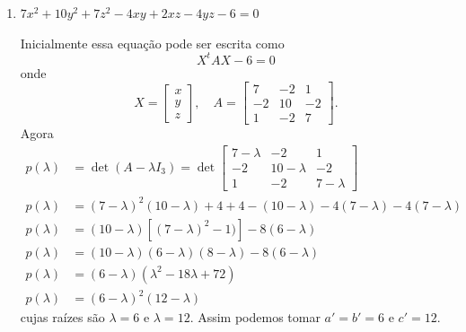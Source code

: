 \begin{exemplos}
\begin{enumerate}
\begin{solucao}
			Como $a' = b'$ devemos encontrar vetores $\vec{U_1}$ e $\vec{U_2}$ soluções unitárias e ortogonais do sistema linear $(A -I_3)X = 0$. Assim podemos tomar
			\begin{align*}
				\vec{U_1} &= \dfrac{1}{\norm{\vec{v_1}}}\vec{v_1} = (1,0,0)\\
				\vec{U_2} &= \dfrac{1}{\norm{\vec{v_2}}}\vec{v_2} = \left(0,-\dfrac{1}{\sqrt{2}},\dfrac{1}{\sqrt{2}}\right)\\
				\vec{U_3} &= \vec{U_1}\times\vec{U_2} = \left(0,-\dfrac{1}{\sqrt{2}},-\dfrac{1}{\sqrt{2}}\right)
			\end{align*}
			e com  isso a mudança $X = QX_1$, onde $Q = [\vec{U_1}\ \vec{U_2}\ \vec{U_3}]$ transforma a equação original em
			\[
				x_1^2 + y_1^2 - z_1^2 = 0
			\]
			que representa um cone circular.
		\end{solucao}

		\item $7x^2 + 10y^2 + 7z^2 - 4xy + 2xz - 4yz - 6 = 0$
		\begin{solucao}
			Inicialmente essa equação pode ser escrita como
			\[
				X^tAX - 6 = 0
			\]
			onde
			\[
				X = \begin{bmatrix}
					x\\ y\\ z
				\end{bmatrix},\quad A = \begin{bmatrix}
					7 & -2 & 1\\
					-2 & 10 & -2\\
					1 & -2 & 7
				\end{bmatrix}.
			\]
			Agora
			\begin{align*}
				p(\lambda) &= \det(A - \lambda I_3) = \det \begin{bmatrix}
					7 - \lambda & -2 & 1\\
					-2 & 10 -\lambda & -2\\
					1 & -2 & 7 -\lambda
				\end{bmatrix}\\
				p(\lambda) &= (7 - \lambda)^2(10 - \lambda) + 4 + 4 - (10 - \lambda) - 4(7 - \lambda) - 4(7 - \lambda)\\
				p(\lambda) &= (10 - \lambda)[(7 - \lambda)^2 - 1)] - 8(6 - \lambda)\\
				p(\lambda) &= (10 - \lambda)(6 - \lambda)(8 - \lambda) - 8(6 - \lambda)\\
				p(\lambda) &= (6 - \lambda)(\lambda^2 - 18\lambda + 72)\\
				p(\lambda) &= (6 - \lambda)^2(12 - \lambda)
			\end{align*}
			cujas raízes são $\lambda = 6$ e $\lambda = 12$. Assim podemos tomar $a' = b' = 6$ e $c' = 12$.


\end{solucao}
\end{enumerate}
\end{exemplos}
